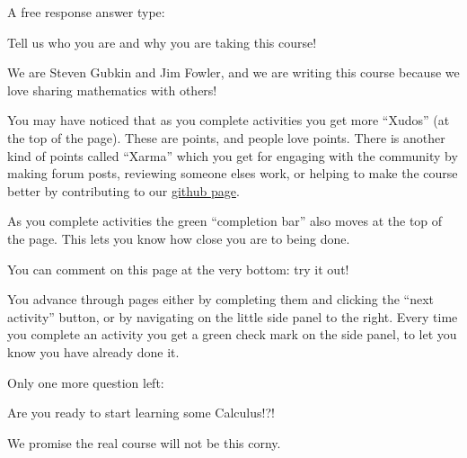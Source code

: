 \documentclass{ximera}
\begin{document}
A free response answer type:

Tell us who you are and why you are taking this course!
\begin{free-response}
  We are Steven Gubkin and Jim Fowler, and we are writing this course because we love sharing mathematics with others!
\end{free-response}

You may have noticed that as you complete activities you get more ``Xudos'' (at the top of the page).  These are points, and people love points.
There is another kind of points called ``Xarma'' which you get for engaging with the community by making forum posts, reviewing someone elses work, or 
helping to make the course better by contributing to our \href{https://github.com/kisonecat/m2o2c2}{github page}.

As you complete activities the green ``completion bar'' also moves at
the top of the page.  This lets you know how close you are to being
done.

You can comment on this page at the very bottom: try it out!

You advance through pages either by completing them and clicking the
``next activity'' button, or by navigating on the little side panel to
the right.  Every time you complete an activity you get a green check
mark on the side panel, to let you know you have already done it.
 
Only one more question left:
\begin{question}
  \begin{solution}
  
    Are you ready to start learning some Calculus!?!
    \begin{hint}
        We promise the real course will not be this corny.
      \end{hint}
    \begin{multiple-choice}
    \end{multiple-choice}
  \end{solution}
\end{question}

\end{document}
